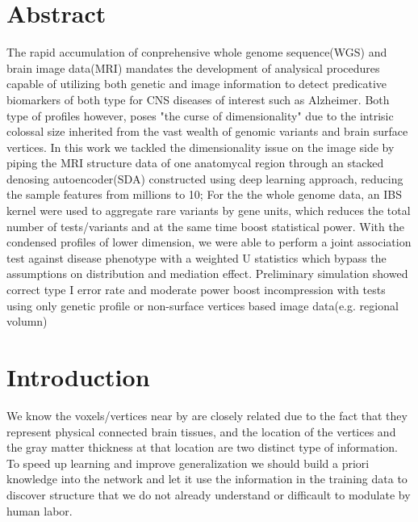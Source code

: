\documentclass{article}
\author{Xiaoran Tong}
\title{}
\begin{document}
\maketitle
\section{Abstract}
The rapid accumulation of conprehensive whole genome sequence(WGS) and brain image data(MRI) mandates the development of analysical procedures capable of utilizing both genetic and image information to detect predicative biomarkers of both type for CNS diseases of interest such as Alzheimer. Both type of profiles however, poses "the curse of dimensionality" due to the intrisic colossal size inherited from the vast wealth of genomic variants and brain surface vertices. In this work we tackled the dimensionality issue on the image side by piping the MRI structure data of one anatomycal region through an stacked denosing autoencoder(SDA) constructed using deep learning approach, reducing the sample features from millions to 10; For the the whole genome data, an IBS kernel were used to aggregate rare variants by gene units, which reduces the total number of tests/variants and at the same time boost statistical power. With the condensed profiles of lower dimension, we were able to perform a joint association test against disease phenotype with a weighted U statistics which bypass the assumptions on distribution and mediation effect. Preliminary simulation showed correct type I error rate and moderate power boost incompression with tests using only genetic profile or non-surface vertices based image data(e.g. regional volumn)

\section{Introduction}
We know the voxels/vertices near by are closely related due to the fact that they represent physical connected brain tissues, and the location of the vertices and the gray matter thickness at that location are two distinct type of information.
To speed up learning and improve generalization we should build a priori knowledge into the network and let it use the information in the training data to discover structure that we do not already understand or difficault to modulate by human labor.
\end{document}
